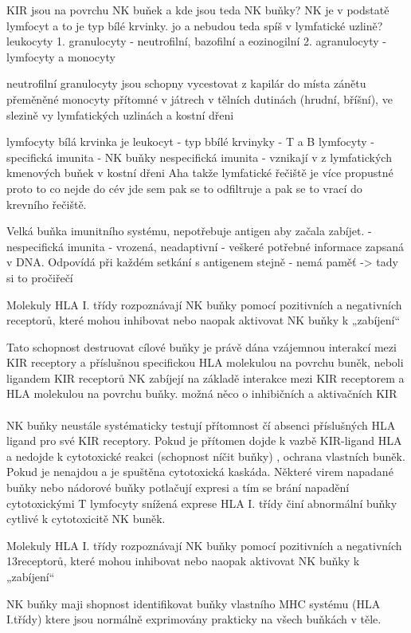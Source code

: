 \documentclass[czech,DP]{thesiskiv}
\begin{document}
KIR jsou na povrchu NK buňek a kde jsou teda NK buňky? 
NK je v podstatě lymfocyt a to je typ bílé krvinky. jo a nebudou teda spíš  v lymfatické uzlině? 
leukocyty 1. granulocyty - neutrofilní, bazofilní a eozinogilní
		2. agranulocyty - lymfocyty a monocyty
		
neutrofilní granulocyty jsou schopny vycestovat z kapilár do místa zánětu
přeměněné monocyty přítomné v játrech v tělních dutinách (hrudní, bříšní), ve slezině vy lymfatických uzlinách a kostní dřeni

lymfocyty 
bílá krvinka je leukocyt
- typ bbílé krvinyky 
- T a B lymfocyty - specifická imunita
- NK buňky nespecifická imunita
- vznikají v z lymfatických kmenových buňek v kostní dřeni
Aha takže lymfatické řečiště je více propustné proto to co nejde do cév jde sem pak se to odfiltruje a pak se to vrací do krevního řečiště.

Velká buňka imunitního systému, nepotřebuje antigen aby začala zabíjet. 
-nespecifická imunita - vrozená, neadaptivní - veškeré potřebné informace zapsaná v DNA. Odpovídá při každém setkání s antigenem stejně - nemá paměť -> tady si to pročiřečí

Molekuly HLA I. třídy rozpoznávají NK buňky pomocí pozitivních a negativních receptorů, které mohou inhibovat nebo naopak aktivovat NK buňky k „zabíjení“

Tato schopnost destruovat cílové buňky je právě dána vzájemnou
interakcí mezi KIR receptory a příslušnou specifickou HLA molekulou
na povrchu buněk, neboli ligandem KIR receptorů
NK zabíjejí na základě interakce mezi KIR receptorem a HLA molekulou na povrchu buňky.
možná něco o inhibičních a aktivačních KIR 
\\
\\
NK buňky neustále systématicky testují přítomnost čí absenci příslušných HLA ligand pro své KIR receptory. Pokud je přítomen dojde k vazbě KIR-ligand HLA a nedojde k cytotoxické reakci (schopnost níčit buňky) , ochrana vlastních buněk. Pokud je 
nenajdou a je spuštěna cytotoxická kaskáda.
Některé virem napadané buňky nebo nádorové buňky potlačují expresi a tím se brání napadění cytotoxickými T lymfocyty
snížená exprese HLA I. třídy činí abnormální buňky cytlivé k cytotoxicitě NK buněk.

 Molekuly HLA I. třídy rozpoznávají NK buňky pomocí pozitivních a negativních
13receptorů, které mohou inhibovat nebo naopak aktivovat NK buňky k „zabíjení“

NK buňky maji shopnost identifikovat buňky vlastního MHC systému (HLA I.třídy) ktere jsou normálně exprimovány prakticky na všech buňkách v těle. 
\end{document}
